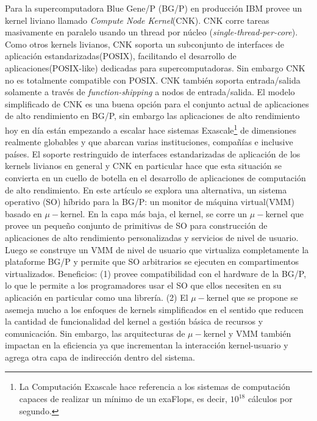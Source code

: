 Para la supercomputadora Blue Gene/P (BG/P) en producción IBM provee un kernel liviano llamado \emph{Compute Node Kernel}(CNK). CNK corre tareas masivamente en paralelo usando un thread por núcleo (\emph{single-thread-per-core}). Como otros kernels livianos, CNK soporta un subconjunto de interfaces de aplicación estandarizadas(POSIX), facilitando el desarrollo de aplicaciones(POSIX-like) dedicadas para supercomputadoras. Sin embargo CNK no es totalmente compatible con POSIX. CNK también soporta entrada/salida solamente a través de \emph{function-shipping} a nodos de entrada/salida. El modelo simplificado de CNK es una buena opción para el conjunto actual de aplicaciones de alto rendimiento en BG/P, sin embargo las aplicaciones de alto rendimiento hoy en día están empezando a escalar hace sistemas Exascale\footnote{La Computación Exascale hace referencia a los sistemas de computación capaces de realizar un mínimo de un exaFlops, es decir, $10^{18}$ cálculos por segundo.} de dimensiones realmente globables y que abarcan varias instituciones, compañías e inclusive países. El soporte restringuido de interfaces estandarizadas de aplicación de los kernels livianos en general y CNK en particular hace que esta situación se convierta en un cuello de botella en el desarrollo de aplicaciones de computación de alto rendimiento. En este artículo se explora una alternativa, un sistema operativo (SO) híbrido para la BG/P: un monitor de máquina virtual(VMM) basado en $\mu-$kernel. En la capa más baja, el kernel, se corre un $\mu-$kernel que provee un pequeño conjunto de primitivas de SO para construcción de aplicaciones de alto rendimiento personalizadas y servicios de nivel de usuario. Luego se construye un VMM de nivel de usuario que virtualiza completamente la plataforme BG/P y permite que SO arbitrarios se ejecuten en compartimentos virtualizados. Beneficios: (1) provee compatibilidad con el hardware de la BG/P, lo que le permite a los programadores usar el SO que ellos necesiten en su aplicación en particular como una librería. (2) El $\mu-$kernel que se propone se asemeja mucho a los enfoques de kernels simplificados en el sentido que reducen la cantidad de funcionalidad del kernel a gestión básica de recursos y comunicación. Sin embargo, las arquitecturas de $\mu-$kernel y VMM también impactan en la eficiencia ya que incrementan la interacción kernel-usuario y agrega otra capa de indirección dentro del sistema.

